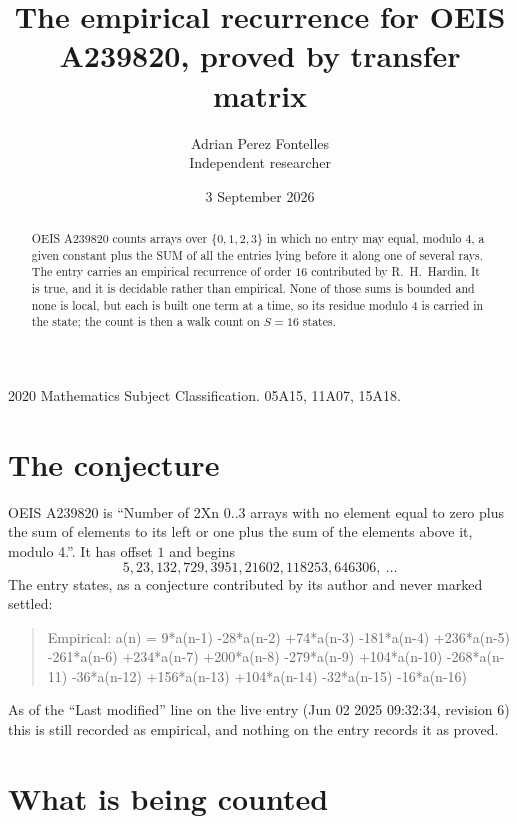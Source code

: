 \documentclass[11pt,a4paper]{article}
\title{The empirical recurrence for OEIS A239820, proved by transfer matrix}
\author{Adrian Perez Fontelles\\ \small Independent researcher}
\date{3 September 2026}
\theoremstyle{plain}
\theoremstyle{definition}
\begin{document}
\maketitle

\begin{abstract}
OEIS A239820 counts arrays over $\{0,1,2,3\}$ in which no entry may equal, modulo $4$, a given
constant plus the SUM of all the entries lying before it along one of several rays. The entry
carries an empirical recurrence of order $16$ contributed by R.~H.~Hardin. It is true, and
it is decidable rather than empirical. None of those sums is bounded and none is local, but
each is built one term at a time, so its residue modulo $4$ is carried in the state; the
count is then a walk count on $S=16$ states.
\end{abstract}

\noindent\small 2020 Mathematics Subject Classification. 05A15, 11A07, 15A18.\normalsize

\section{The conjecture}

OEIS A239820 is ``Number of 2Xn 0..3 arrays with no element equal to zero plus the sum of elements to its left or one plus the sum of the elements above it, modulo 4.''. It has offset $1$ and begins
\[
5, 23, 132, 729, 3951, 21602, 118253, 646306,\ \dots
\]
The entry states, as a conjecture contributed by its author and never marked settled:
\begin{quote}
Empirical: a(n) = 9*a(n-1) -28*a(n-2) +74*a(n-3) -181*a(n-4) +236*a(n-5) -261*a(n-6) +234*a(n-7) +200*a(n-8) -279*a(n-9) +104*a(n-10) -268*a(n-11) -36*a(n-12) +156*a(n-13) +104*a(n-14) -32*a(n-15) -16*a(n-16)
\end{quote}
As of the ``Last modified'' line on the live entry (Jun 02 2025 09:32:34, revision 6) this is still
recorded as empirical, and nothing on the entry records it as proved.

\section{What is being counted}
\end{document}
